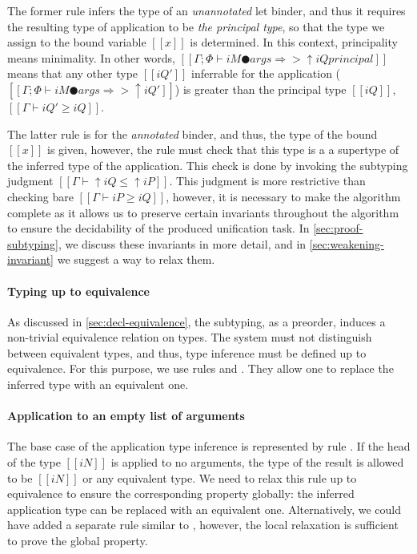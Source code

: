   The former rule infers the type of an \emph{unannotated} let binder, and thus
  it requires the resulting type of application to be \emph{the principal type},
  so that the type we assign to the bound variable $[[x]]$ is determined.
  In this context, principality means minimality. In other words, 
  $[[Γ ; Φ ⊢ iM ● args ⇒> ↑iQ principal]]$ means that
  any other type $[[iQ']]$ inferrable for the application (\ie $[[Γ ; Φ ⊢ iM ● args ⇒> ↑iQ']]$)
  is greater than the principal type $[[iQ]]$, \ie $[[Γ ⊢ iQ' ≥ iQ]]$.

  The latter rule is for the \emph{annotated} binder,
  and thus, the type of the bound $[[x]]$ is given, 
  however, the rule must check that this type is a
  a supertype of the inferred type of the application. 
  This check is done by invoking the subtyping judgment
  $[[Γ ⊢ ↑iQ ≤ ↑iP]]$.
  This judgment is more restrictive than checking bare 
  $[[Γ ⊢ iP ≥ iQ]]$, however, it is necessary
  to make the algorithm complete as it allows us to preserve
  certain invariants throughout the algorithm to ensure
  the decidability of the produced unification task.
  In \cref{sec:proof-subtyping}, we discuss these invariants in
  more detail, and in \cref{sec:weakening-invariant} we suggest 
  a way to relax them.

\paragraph{Typing up to equivalence}
  As discussed in \cref{sec:decl-equivalence}, the subtyping, as a preorder, 
  induces a non-trivial equivalence relation on types. 
  The system must not distinguish between equivalent types,
  and thus, type inference must be defined up to equivalence. 
  For this purpose, we use rules   
  and .
  They allow one to replace the inferred type with an equivalent one.  

\paragraph{Application to an empty list of arguments}
  The base case of the application type inference is 
  represented by rule .
  If the head of the type $[[iN]]$ is applied to no arguments, 
  the type of the result is allowed to be $[[iN]]$ or any 
  equivalent type. We need to relax this rule up to equivalence
  to ensure the corresponding property globally:
  the inferred application type can be replaced with an equivalent one.
  Alternatively, we could have added a separate rule similar to 
  , however, 
  the local relaxation is sufficient to prove the global property.

